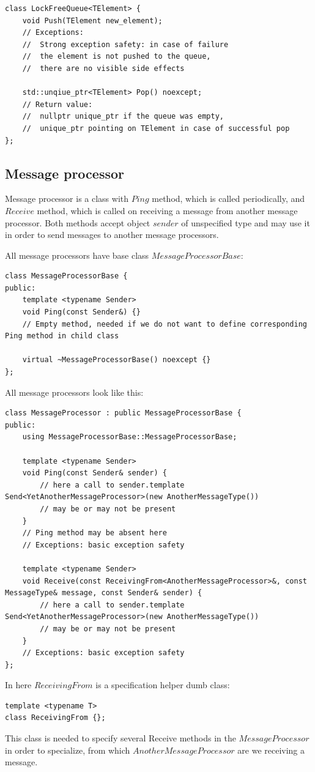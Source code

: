 \documentclass{article}
\begin{document}
\begin{lstlisting}
class LockFreeQueue<TElement> {
	void Push(TElement new_element);
	// Exceptions:
	// 	Strong exception safety: in case of failure
	// 	the element is not pushed to the queue,
	// 	there are no visible side effects

	std::unqiue_ptr<TElement> Pop() noexcept;
	// Return value:
	// 	nullptr unique_ptr if the queue was empty,
	// 	unique_ptr pointing on TElement in case of successful pop
};
\end{lstlisting}

\subsection{Message processor}
\label{subsec:message_processor}
Message processor is a class with $Ping$ method, which is called periodically, and $Receive$ method, which is called on receiving a message from another message processor. Both methods accept object $sender$ of unspecified type and may use it in order to send messages to another message processors.

All message processors have base class $MessageProcessorBase$:

\begin{lstlisting}
class MessageProcessorBase {
public:
	template <typename Sender>
	void Ping(const Sender&) {}
	// Empty method, needed if we do not want to define corresponding Ping method in child class

	virtual ~MessageProcessorBase() noexcept {}
};
\end{lstlisting}

All message processors look like this:
\begin{lstlisting}
class MessageProcessor : public MessageProcessorBase {
public:
	using MessageProcessorBase::MessageProcessorBase;

	template <typename Sender>
	void Ping(const Sender& sender) {
		// here a call to sender.template Send<YetAnotherMessageProcessor>(new AnotherMessageType())
		// may be or may not be present
	}
	// Ping method may be absent here
	// Exceptions: basic exception safety

	template <typename Sender>
	void Receive(const ReceivingFrom<AnotherMessageProcessor>&, const MessageType& message, const Sender& sender) {
		// here a call to sender.template Send<YetAnotherMessageProcessor>(new AnotherMessageType())
		// may be or may not be present
	}
	// Exceptions: basic exception safety
};
\end{lstlisting}
In here $ReceivingFrom$ is a specification helper dumb class:
\begin{lstlisting}
template <typename T>
class ReceivingFrom {};
\end{lstlisting}
This class is needed to specify several Receive methods in the $MessageProcessor$ in order to specialize, from which $AnotherMessageProcessor$ are we receiving a message.
\end{document}
